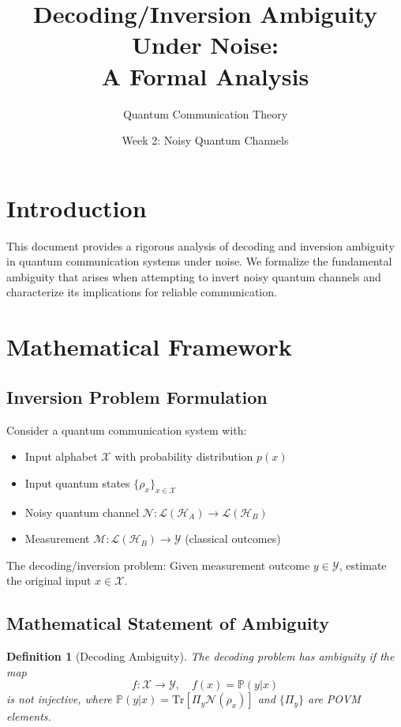 \documentclass[12pt]{article}
\title{Decoding/Inversion Ambiguity Under Noise: \\ A Formal Analysis}
\author{Quantum Communication Theory}
\date{Week 2: Noisy Quantum Channels}
\newtheorem{definition}{Definition}
\begin{document}
\maketitle

\section{Introduction}
This document provides a rigorous analysis of decoding and inversion ambiguity in quantum communication systems under noise. We formalize the fundamental ambiguity that arises when attempting to invert noisy quantum channels and characterize its implications for reliable communication.

\section{Mathematical Framework}

\subsection{Inversion Problem Formulation}
Consider a quantum communication system with:
\begin{itemize}
    \item Input alphabet $\mathcal{X}$ with probability distribution $p(x)$
    \item Input quantum states $\{\rho_x\}_{x \in \mathcal{X}}$
    \item Noisy quantum channel $\mathcal{N}: \mathcal{L}(\mathcal{H}_A) \to \mathcal{L}(\mathcal{H}_B)$
    \item Measurement $\mathcal{M}: \mathcal{L}(\mathcal{H}_B) \to \mathcal{Y}$ (classical outcomes)
\end{itemize}

The decoding/inversion problem: Given measurement outcome $y \in \mathcal{Y}$, estimate the original input $x \in \mathcal{X}$.

\subsection{Mathematical Statement of Ambiguity}
\begin{definition}[Decoding Ambiguity]
The decoding problem has ambiguity if the map
\[
f: \mathcal{X} \to \mathcal{Y}, \quad f(x) = \mathbb{P}(y|x)
\]
is not injective, where $\mathbb{P}(y|x) = \text{Tr}[\Pi_y \mathcal{N}(\rho_x)]$ and $\{\Pi_y\}$ are POVM elements.
\end{definition}
\end{document}
